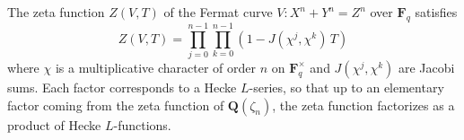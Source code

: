 The zeta function $Z(V,T)$ of the Fermat curve $V: X^n + Y^n = Z^n$ over $\mathbf{F}_q$ satisfies
$$Z(V,T) = \prod_{j=0}^{n-1} \prod_{k=0}^{n-1} (1 - J(\chi^j, \chi^k) \, T)$$
where $\chi$ is a multiplicative character of order $n$ on $\mathbf{F}_q^\times$ and $J(\chi^j, \chi^k)$ are Jacobi sums. Each factor corresponds to a Hecke $L$-series, so that up to an elementary factor coming from the zeta function of $\mathbf{Q}(\zeta_n)$, the zeta function factorizes as a product of Hecke $L$-functions.
